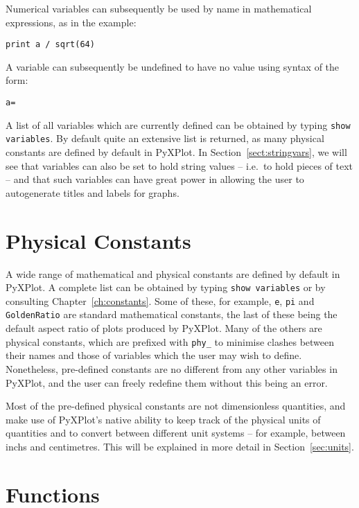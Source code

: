 \noindent Numerical variables can subsequently be used by name in mathematical
expressions, as in the example:

\begin{verbatim}
print a / sqrt(64)
\end{verbatim}

\noindent A variable can subsequently be undefined to have no value using
syntax of the form:

\begin{verbatim}
a=
\end{verbatim}

A list of all variables which are currently defined can be obtained by typing
{\tt show variables}. By default quite an extensive list
is returned, as many physical constants are defined by default in PyXPlot. In
Section~\ref{sect:stringvars}, we will see that variables can also be set to
hold string values -- i.e.\ to hold pieces of text -- and that such variables
can have great power in allowing the user to autogenerate titles and labels for
graphs.

\section{Physical Constants}
\label{sec:constants}

A wide range of mathematical and physical constants are defined by default in
PyXPlot. A complete list can be obtained by typing {\tt show variables} or by
consulting Chapter~\ref{ch:constants}. Some of these, for example, {\tt e},
{\tt pi} and {\tt GoldenRatio} are standard mathematical constants, the last of
these being the default aspect ratio of plots produced by PyXPlot. Many of the
others are physical constants, which are prefixed with {\tt phy\_} to minimise
clashes between their names and those of variables which the user may wish to
define.  Nonetheless, pre-defined constants are no different from any other
variables in PyXPlot, and the user can freely redefine them without this being
an error.

Most of the pre-defined physical constants are not dimensionless quantities,
and make use of PyXPlot's native ability to keep track of the physical units of
quantities and to convert between different unit systems -- for example,
between inchs and centimetres.  This will be explained in more detail in
Section~\ref{sec:units}.

\section{Functions}

